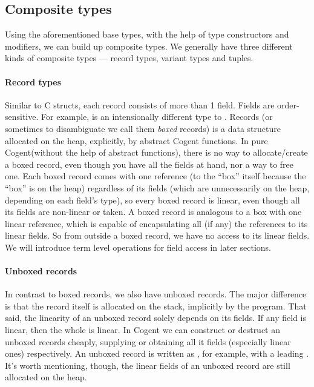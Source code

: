 \documentclass[a4paper]{article}
\newcommand{\cogent}{Cogent\xspace}
\newcommand{\Cogent}{\cogent\xspace}
\begin{document}
\subsection{Composite types} 

Using the aforementioned base types, with the help of type constructors and modifiers, we can build up
composite types. We generally have three different kinds of composite types --- record types, variant types
and tuples.

\paragraph{Record types} Similar to C structs, each record consists of more than 1 field. Fields are order-sensitive.
For example,  is an intensionally different type to .
Records (or sometimes to disambiguate we call them \emph{boxed} records) is a data structure allocated on the heap,
explicitly, by abstract \Cogent functions. In pure \Cogent (without the help of abstract functions), there is no way to allocate/create 
a boxed record, even though you have all the fields at hand, nor a way to free one. Each boxed record comes with
one reference (to the ``box'' itself because the ``box'' is on the heap) regardless of its fields (which
are unnecessarily on the heap, depending on each field's type), so every 
boxed record is linear, even though all its fields are non-linear or taken. A boxed record is analogous to
a box with one linear reference, which is capable of encapsulating all (if any) the references to its linear fields. So from outside
a boxed record, we have no access to its linear fields. We will introduce term level operations for field access in later sections.

\paragraph{Unboxed records} In contrast to boxed records, we also have unboxed records. The major difference is that
the record itself is allocated on the stack, implicitly by the program. That said, the linearity of an unboxed record
solely depends on its fields. If any field is linear, then the whole is linear. In \cogent we can construct or destruct an
unboxed records cheaply, supplying or obtaining all it fields (especially linear ones) respectively. An unboxed record
is written as , for example, with a leading \code{\#}. It's worth mentioning, though, the linear
fields of an unboxed record are still allocated on the heap.
\end{document}
